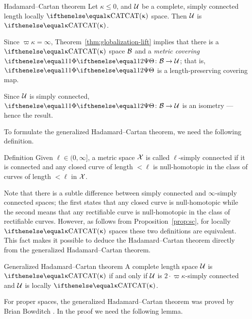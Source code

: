 \begin{thm}{Hadamard--Cartan theorem}
\label{thm:hadamard-cartan}
Let $\kappa\le 0$, and $\mathcal{U}$ be a complete, simply connected length locally $\CAT\kappa$ space.
Then $\mathcal{U}$ is $\CAT\kappa$.
\end{thm}

 Since $\varpi\kappa=\infty$, Theorem~\ref{thm:globalization-lift} implies that there is a $\CAT\kappa$ space $\mathcal{B}$ and a \emph{metric covering} $\map\:\spc{B}\to\spc{U}$; that is, $\map$ is a length-preserving covering map. 

Since $\mathcal{U}$ is simply connected, $\map\:\spc{B}\to\spc{U}$ is an isometry --- hence the result.
\qeds

To formulate the generalized Hadamard--Cartan theorem,
we need the following definition.

\begin{thm}{Definition}\label{def:l-s.c.}
Given $\ell\in (0,\infty]$,
a metric space $\mathcal{X}$ is called 
$\ell$-simply connected 
if it is connected and 
any closed curve of length $<\ell$ 
is null-homotopic in the class of curves of length $<\ell$ in $\mathcal{X}$.
\end{thm}

Note that there is a subtle difference between 
simply connected and $\infty$-simply connected spaces;
the first states that any closed curve is null-homotopic while the second means that any rectifiable curve is null-homotopic in the class of rectifiable curves.
However, as follows from Proposition~\ref{prop:sc}, for locally $\CAT\kappa$ spaces these two definitions are equivalent.
This fact makes it possible to deduce the Hadamard--Cartan theorem directly from the generalized Hadamard--Cartan theorem.

{\sloppy

\begin{thm}{Generalized Hadamard--Cartan theorem}\label{thm:hadamard-cartan-gen}
A complete length space
$\mathcal{U}$ is $\CAT\kappa$ 
if and only if $\mathcal{U}$ is $2\cdot\varpi\kappa$-simply connected
and $\mathcal{U}$ is locally $\CAT\kappa$.
\end{thm}

}

For proper spaces, the generalized Hadamard--Cartan theorem was proved by Brian Bowditch \cite{bowditch}.
In the proof we need the following lemma.

